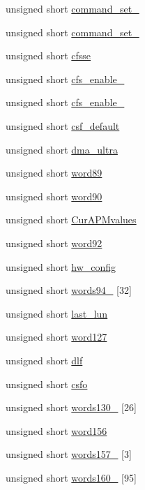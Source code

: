 \begin{DoxyCompactItemize}
unsigned short \hyperlink{structident__device__t_a4eb0292566454e00ecba5e5a0d8e613f}{command\+\_\+set\+\_}
\item 
unsigned short \hyperlink{structident__device__t_abd3639653bdac02a650a0c263e2d6dc3}{command\+\_\+set\+\_}
\item 
unsigned short \hyperlink{structident__device__t_a471a93b5ad51421739da90fb7411098c}{cfsse}
\item 
unsigned short \hyperlink{structident__device__t_a0ec1d5bb87dd9448de785f41e9c227bb}{cfs\+\_\+enable\+\_}
\item 
unsigned short \hyperlink{structident__device__t_a9c56b377c273470a41e0c13b9681fe9e}{cfs\+\_\+enable\+\_}
\item 
unsigned short \hyperlink{structident__device__t_a47ec6f0b2fe379bdd5af96c966c3cf26}{csf\+\_\+default}
\item 
unsigned short \hyperlink{structident__device__t_a380b2b09664f4058c69ab22e54e71c59}{dma\+\_\+ultra}
\item 
unsigned short \hyperlink{structident__device__t_afe35780760139a739638cfe4e3b93fb9}{word89}
\item 
unsigned short \hyperlink{structident__device__t_aecb00df2d3c8414264a12b6ddb8afcb8}{word90}
\item 
unsigned short \hyperlink{structident__device__t_a7e34107276efe12de800e1dba6b9e476}{Cur\+A\+P\+Mvalues}
\item 
unsigned short \hyperlink{structident__device__t_a8ec1dbaa797ef886e2c7ba8b4940f442}{word92}
\item 
unsigned short \hyperlink{structident__device__t_a1f9499790ad26349d6df3e7c8f52c2fa}{hw\+\_\+config}
\item 
unsigned short \hyperlink{structident__device__t_a32485bac63213d7c0780a89df8b066e3}{words94\+\_} \mbox{[}32\mbox{]}
\item 
unsigned short \hyperlink{structident__device__t_a58554aa90ee1104efe6839cd224570a0}{last\+\_\+lun}
\item 
unsigned short \hyperlink{structident__device__t_aafda7436375102d5165194c20b9c4861}{word127}
\item 
unsigned short \hyperlink{structident__device__t_a4dbb8da5f32a2d02cee8365d22ce3b68}{dlf}
\item 
unsigned short \hyperlink{structident__device__t_aadfa929967cf77a8dd7338516b3b39b4}{csfo}
\item 
unsigned short \hyperlink{structident__device__t_a663ba0f8b9d12f16691962d97e269d22}{words130\+\_} \mbox{[}26\mbox{]}
\item 
unsigned short \hyperlink{structident__device__t_ab2883d4ef22029232a95fc6c7fc1489b}{word156}
\item 
unsigned short \hyperlink{structident__device__t_a3be0642d7da6a8ba1cc4e4efe30e4058}{words157\+\_} \mbox{[}3\mbox{]}
\item 
unsigned short \hyperlink{structident__device__t_a9a4568ee4fc1d39076c9338ab8aa1970}{words160\+\_} \mbox{[}95\mbox{]}
\end{DoxyCompactItemize}


